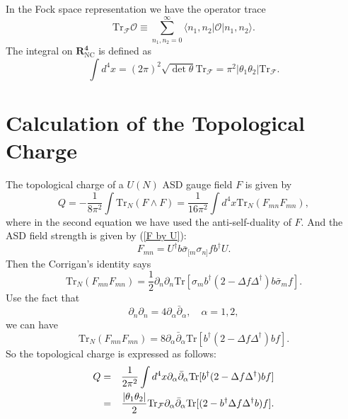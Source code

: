 \documentclass[a4paper,a4paper]{article}
\begin{document}
In the Fock space representation we have the operator trace%
\begin{equation}
\mathrm{Tr}_\mathcal{F}\mathcal{O}\equiv
\sum_{n_{1},n_{2}=0}^{\infty }\langle
n_{1},n_{2}|\mathcal{O}|n_{1},n_{2}\rangle . \label{trace}
\end{equation}%
The integral on $\mathbf{{R}_{\mathrm{NC}}^{4}}$ is defined as%
\begin{equation}
\int d^{4}x=(2\pi )^{2}\sqrt{\det \theta
}\mathrm{Tr}_\mathcal{F}=\pi ^{2}|\theta _{1}\theta
_{2}|\mathrm{Tr}_\mathcal{F}.
\end{equation}

\section{Calculation of the Topological Charge}

The topological charge of a $U(N)$ ASD gauge field $F$ is given by%
\begin{equation}
Q=-\frac{1}{8\pi ^{2}}\int \mathrm{Tr}_{N}(F\wedge F)=\frac{1}{16\pi ^{2}}%
\int d^{4}x\mathrm{Tr}_{N}(F_{mn}F_{mn}),
\end{equation}%
where in the second equation we have used the anti-self-duality of $F$. And
the ASD field strength is given by (\ref{F by U}):%
\begin{equation}
F_{mn}=U^{\dag }b\bar{\sigma}_{[m}\sigma _{n]}fb^{\dag }U.
\end{equation}%
Then the Corrigan's identity says%
\begin{equation}
\mathrm{Tr}_{N}(F_{mn}F_{mn})=\frac{1}{2}\partial _{n}\partial _{n}\mathrm{Tr%
}[\sigma _{m}b^{\dag }(2-\Delta f\Delta ^{\dag })b\bar{\sigma}_{m}f].
\end{equation}%
Use the fact that%
\begin{equation}
\partial _{n}\partial _{n}=4\partial _{\alpha }\bar{\partial}_{\alpha
},\quad \alpha =1,2,
\end{equation}%
we can have%
\begin{equation}
\mathrm{Tr}_{N}(F_{mn}F_{mn})=8\partial _{\alpha }\bar{\partial}_{\alpha }%
\mathrm{Tr}[b^{\dag }(2-\Delta f\Delta ^{\dag })bf].
\end{equation}%
So the topological charge is expressed as follows:%
\begin{eqnarray}
Q &=&\frac{1}{2\pi ^{2}}\int d^{4}x\partial _{\alpha }\bar{\partial}_{\alpha
}\mathrm{Tr}[b^{\dag }(2-\Delta f\Delta ^{\dag })bf]  \nonumber \\
&=&\frac{|\theta _{1}\theta _{2}|}{2}\mathrm{Tr}_\mathcal{F}\partial _{\alpha }\bar{%
\partial}_{\alpha }\mathrm{Tr}[(2-b^{\dag }\Delta f\Delta ^{\dag }b)f].
\end{eqnarray}
\end{document}
